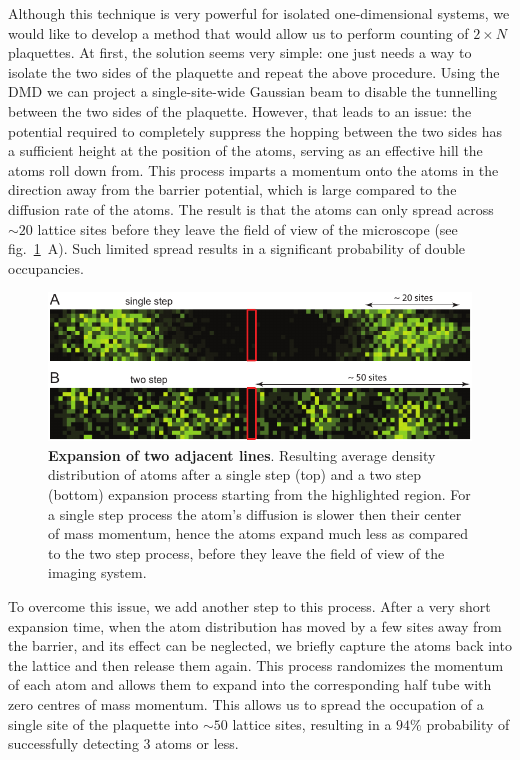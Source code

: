 Although this technique is very powerful for isolated one-dimensional systems, we would like to develop a method that would allow us to perform counting of $2\times N$ plaquettes. At first, the solution seems very simple: one just needs a way to isolate the two sides of the plaquette and repeat the above procedure. Using the DMD we can project a single-site-wide Gaussian beam to disable the tunnelling between the two sides of the plaquette. However, that leads to an issue: the potential required to completely suppress the hopping between the two sides has a sufficient height at the position of the atoms, serving as an effective hill the atoms roll down from. This process imparts a momentum onto the atoms in the direction away from the barrier potential, which is large compared to the diffusion rate of the atoms. The result is that the atoms can only spread across $\sim 20$ lattice sites before they leave the field of view of the microscope (see fig.~\ref{fig:CTE_expansion}~A). Such limited spread results in a significant probability of double occupancies.

\begin{figure}[t]
	\centering
	\includegraphics[scale=1]{figures/CTE_expansion.pdf}
	\caption{{\bf Expansion of two adjacent lines}. Resulting average density distribution of atoms after a single step (top) and a two step (bottom) expansion process starting from the highlighted region. For a single step process the atom's diffusion is slower then their center of mass momentum, hence the atoms expand much less as compared to the two step process, before they leave the field of view of the imaging system.}
	\label{fig:CTE_expansion}
\end{figure}

To overcome this issue, we add another step to this process. After a very short expansion time, when the atom distribution has moved by a few sites away from the barrier, and its effect can be neglected, we briefly capture the atoms back into the lattice and then release them again. This process randomizes the momentum of each atom and allows them to expand into the corresponding half tube with zero centres of mass momentum. This allows us to spread the occupation of a single site of the plaquette into $\sim 50$ lattice sites, resulting in a $94\%$ probability of successfully detecting $3$ atoms or less. 